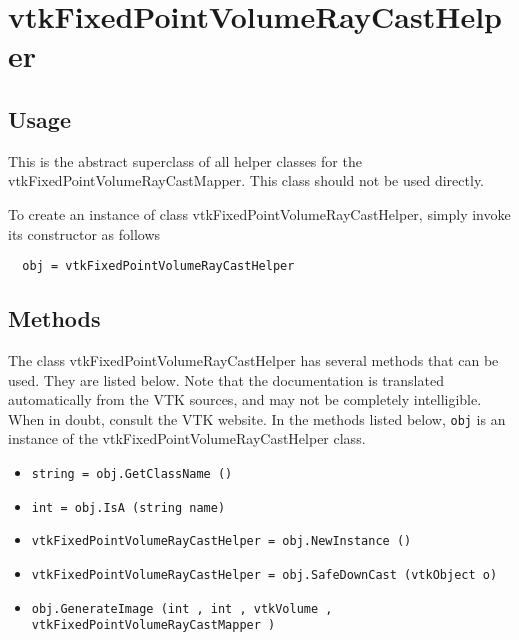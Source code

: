 \section{vtkFixedPointVolumeRayCastHelper}

\subsection{Usage}

 This is the abstract superclass of all helper classes for the 
 vtkFixedPointVolumeRayCastMapper. This class should not be used directly.


To create an instance of class vtkFixedPointVolumeRayCastHelper, simply
invoke its constructor as follows
\begin{verbatim}
  obj = vtkFixedPointVolumeRayCastHelper
\end{verbatim}
\subsection{Methods}

The class vtkFixedPointVolumeRayCastHelper has several methods that can be used.
  They are listed below.
Note that the documentation is translated automatically from the VTK sources,
and may not be completely intelligible.  When in doubt, consult the VTK website.
In the methods listed below, \verb|obj| is an instance of the vtkFixedPointVolumeRayCastHelper class.
\begin{itemize}
\item  \verb|string = obj.GetClassName ()|

\item  \verb|int = obj.IsA (string name)|

\item  \verb|vtkFixedPointVolumeRayCastHelper = obj.NewInstance ()|

\item  \verb|vtkFixedPointVolumeRayCastHelper = obj.SafeDownCast (vtkObject o)|

\item  \verb|obj.GenerateImage (int , int , vtkVolume , vtkFixedPointVolumeRayCastMapper )|

\end{itemize}

